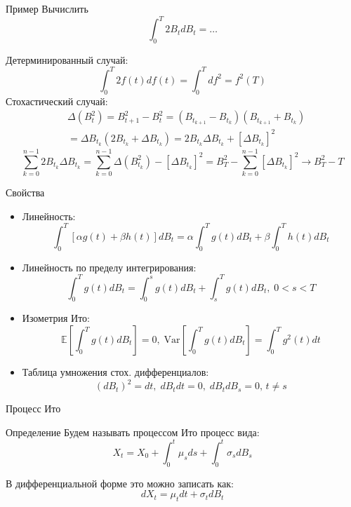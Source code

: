 \documentclass{beamer}
\begin{document}
\begin{frame}{Пример}
    Вычислить
    $$
        \int_0^T 2 B_t dB_t = \ldots
    $$
     
    Детерминированный случай:
    $$
        \int_0^T 2 f(t) df(t) = \int_0^T d f^2 = f^2(T)
    $$ 
    Стохастический случай:
    \begin{align*}
        &\Delta \left(B_t^2\right) = B_{t+1}^2 - B_t^2 = \left( B_{t_{k+1}}-B_{t_k} \right)
        \left( B_{t_{k+1}}+B_{t_k} \right)\\ 
        &= \Delta B_{t_k} \left( 2 B_{t_k} + \Delta B_{t_k}\right) = 2 B_{t_k} \Delta B_{t_k} + \left[\Delta B_{t_k}\right]^2
    \end{align*} 
    $$
        \sum_{k=0}^{n-1} 2 B_{t_k} \Delta B_{t_k} = 
        \sum_{k=0}^{n-1}\Delta \left(B_{t_k}^2\right) - \left[\Delta B_{t_k}\right]^2 = B_T^2 - \sum_{k=0}^{n-1} \left[\Delta B_{t_k}\right]^2 \to B_T^2 - T 
    $$
\end{frame}

\begin{frame}{Свойства}
    \begin{itemize}
        \item Линейность: $$\int_{0}^T \left[\alpha g(t) + \beta h(t)\right] dB_t = \alpha \int_0^T g(t) dB_t + \beta \int_0^T h(t) dB_t$$
        \item Линейность по пределу интегрирования:
        $$\int_0^T g(t) dB_t = \int_0^s g(t) dB_t + \int_s^T g(t) dB_t, \; 0 < s < T$$
        \item Изометрия Ито:
        $$
            \mathbb{E} \left[\int_0^T g(t) dB_t \right] = 0, \; \mathrm{Var} \left[\int_0^T g(t) dB_t\right] = \int_0^T g^2(t) dt
        $$
        \item Таблица умножения стох. дифференциалов:
        $$
            (dB_t)^2 = dt,\; dB_t dt = 0, \; dB_t dB_s = 0, \, t\neq s 
        $$
    \end{itemize}
\end{frame}

\begin{frame}{Процесс Ито}
    \begin{block}{Определение}
        Будем называть процессом Ито процесс вида:
        $$
            X_t = X_0 + \int_0^t \mu_s ds + \int_0^t \sigma_s dB_s
        $$
    \end{block}
    В дифференциальной форме это можно записать как:
    $$
        dX_t = \mu_t dt + \sigma_t dB_t
    $$
\end{frame}
\end{document}

